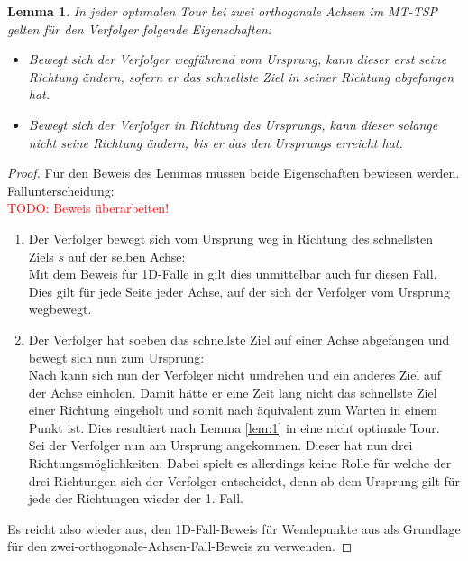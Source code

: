 \documentclass[german,version-2019-11]{uzl-thesis}
\newtheorem{lem}{Lemma}
\begin{document}
\begin{lem}
\label{lem:2}
In jeder optimalen Tour bei zwei orthogonale Achsen im MT-TSP gelten für den Verfolger folgende Eigenschaften:
\begin{itemize}
\item
Bewegt sich der Verfolger wegführend vom Ursprung, kann dieser erst seine Richtung ändern, sofern er das schnellste Ziel in seiner Richtung abgefangen hat.
\item
Bewegt sich der Verfolger in Richtung des Ursprungs, kann dieser solange nicht seine Richtung ändern, bis er das den Ursprungs erreicht hat.
\end{itemize}
\end{lem}

\begin{proof}
Für den Beweis des Lemmas müssen beide Eigenschaften bewiesen werden.\\
Fallunterscheidung:\\
\textcolor{red}{TODO: Beweis überarbeiten!}
\begin{enumerate}
\item Der Verfolger bewegt sich vom Ursprung weg in Richtung des schnellsten Ziels $s$ auf der selben Achse: \\
Mit dem Beweis für 1D-Fälle in \cite{helvig} gilt dies unmittelbar auch für diesen Fall. Dies gilt für jede Seite jeder Achse, auf der sich der Verfolger vom Ursprung wegbewegt.

\item Der Verfolger hat soeben das schnellste Ziel auf einer Achse abgefangen und bewegt sich nun zum Ursprung:\\
Nach \cite{helvig} kann sich nun der Verfolger nicht umdrehen und ein anderes Ziel auf der Achse einholen. Damit hätte er eine Zeit lang nicht das schnellste Ziel einer Richtung eingeholt und somit nach \cite{helvig} äquivalent zum Warten in einem Punkt ist. Dies resultiert nach Lemma \ref{lem:1} in eine nicht optimale Tour.\\
Sei der Verfolger nun am Ursprung angekommen. Dieser hat nun drei Richtungsmöglichkeiten. Dabei spielt es allerdings keine Rolle für welche der drei Richtungen sich der Verfolger entscheidet, denn ab dem Ursprung gilt für jede der Richtungen wieder der 1. Fall.
\end{enumerate} \noindent
Es reicht also wieder aus, den 1D-Fall-Beweis für Wendepunkte aus \cite{helvig} als Grundlage für den zwei-orthogonale-Achsen-Fall-Beweis zu verwenden.
\end{proof}
\end{document}
